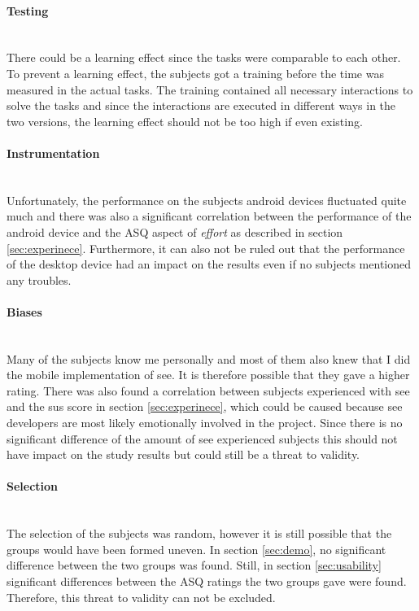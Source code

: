 \paragraph{Testing}\mbox{}\\
There could be a learning effect since the tasks were comparable to each other. 
To prevent a learning effect, the subjects got a training before the time was measured in the actual tasks.
The training contained all necessary interactions to solve the tasks and since the interactions are executed in different ways in the two versions, the learning effect should not be too high if even existing.

\paragraph{Instrumentation}\mbox{}\\
Unfortunately, the performance on the subjects \gls{android} devices fluctuated quite much and there was also a significant correlation between the performance of the \gls{android} device and the \gls{ASQ} aspect of \textit{effort} as described in section \ref{sec:experinece}.
Furthermore, it can also not be ruled out that the performance of the desktop device had an impact on the results even if no subjects mentioned any troubles.
\paragraph{Biases}\mbox{}\\
Many of the subjects know me personally and most of them also knew that I did the mobile implementation of \gls{see}. 
It is therefore possible that they gave a higher rating. 
There was also found a correlation between subjects experienced with \gls{see} and the \gls{sus} score in section \ref{sec:experinece}, which could be caused because \gls{see} developers are most likely emotionally involved in the project.
Since there is no significant difference of the amount of \gls{see} experienced subjects this should not have impact on the study results but could still be a threat to validity.
\paragraph{Selection}\mbox{}\\
The selection of the subjects was random, however it is still possible that the groups would have been formed uneven.
In section \ref{sec:demo}, no significant difference between the two groups was found.
Still, in section \ref{sec:usability} significant differences between the \gls{ASQ} ratings the two groups gave were found.
Therefore, this threat to validity can not be excluded. 

